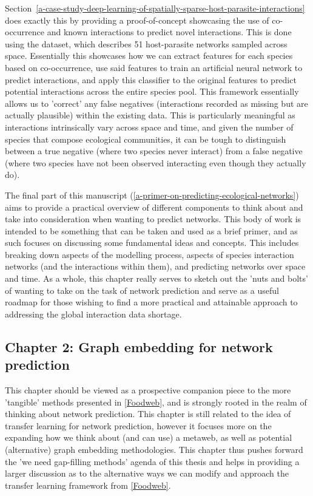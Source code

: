 \begin{refsection}
Section~\ref{a-case-study-deep-learning-of-spatially-sparse-host-parasite-interactions} does exactly this by providing a proof-of-concept showcasing the use of co-occurrence and known interactions to predict novel interactions. This is done using the \cite{Hadfield2014TalTwo} dataset, which describes 51 host-parasite networks sampled across space. Essentially this showcases how we can extract features for each species based on co-occurrence, use said features to train an artificial neural network to predict interactions, and apply this classifier to the original features to predict potential interactions across the entire species pool. This framework essentially allows us to 'correct' any false negatives (interactions recorded as missing but are actually plausible) within the existing data. This is particularly meaningful as interactions intrinsically vary across space and time, and given the number of species that compose ecological communities, it can be tough to distinguish between a true negative (where two species never interact) from a false negative (where two species have not been observed interacting even though they actually do).

The final part of this manuscript (\autoref{a-primer-on-predicting-ecological-networks}) aims to provide a practical overview of different components to think about and take into consideration when wanting to predict networks. This body of work is intended to be something that can be taken and used as a brief primer, and as such focuses on discussing some fundamental ideas and concepts. This includes breaking down aspects of the modelling process, aspects of species interaction networks (and the interactions within them), and predicting networks over space and time. As a whole, this chapter really serves to sketch out the 'nuts and bolts' of wanting to take on the task of network prediction and serve as a useful roadmap for those wishing to find a more practical and attainable approach to addressing the global interaction data shortage.

\subsection{Chapter 2: Graph embedding for network prediction}

This chapter should be viewed as a prospective companion piece to the more 'tangible' methods presented in \autoref{Foodweb}, and is strongly rooted in the realm of thinking about network prediction. This chapter is still related to the idea of transfer learning for network prediction, however it focuses more on the expanding how we think about (and can use) a metaweb, as well as potential (alternative) graph embedding methodologies. This chapter thus pushes forward the 'we need gap-filling methods' agenda of this thesis and helps in providing a larger discussion as to the alternative ways we can modify and approach the transfer learning framework from \autoref{Foodweb}.


\end{refsection}
